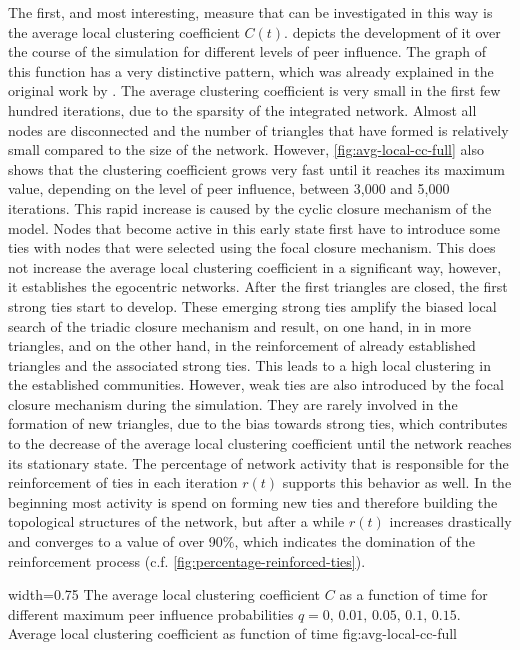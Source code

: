 The first, and most interesting, measure that can be investigated in this way is the average local clustering coefficient \( C(t) \).
 depicts the development of it over the course of the simulation for different levels of peer influence.
The graph of this function has a very distinctive pattern, which was already explained in the original work by \citet{Laurent2015}.
The average clustering coefficient is very small in the first few hundred iterations, due to the sparsity of the integrated network.
Almost all nodes are disconnected and the number of triangles that have formed is relatively small compared to the size of the network.
However, \cref{fig:avg-local-cc-full} also shows that the clustering coefficient grows very fast until it reaches its maximum value, depending on the level of peer influence, between 3,000 and 5,000 iterations.
This rapid increase is caused by the cyclic closure mechanism of the model.
Nodes that become active in this early state first have to introduce some ties with nodes that were selected using the focal closure mechanism.
This does not increase the average local clustering coefficient in a significant way, however, it establishes the egocentric networks.
After the first triangles are closed, the first strong ties start to develop.
These emerging strong ties amplify the biased local search of the triadic closure mechanism and result, on one hand, in in more triangles, and on the other hand, in the reinforcement of already established triangles and the associated strong ties.
This leads to a high local clustering in the established communities.
However, weak ties are also introduced by the focal closure mechanism during the simulation.
They are rarely involved in the formation of new triangles, due to the bias towards strong ties, which contributes to the decrease of the average local clustering coefficient until the network reaches its stationary state.
The percentage of network activity that is responsible for the reinforcement of ties in each iteration \( r(t) \) supports this behavior as well.
In the beginning most activity is spend on forming new ties and therefore building the topological structures of the network, but after a while \( r(t) \) increases drastically and converges to a value of over 90\%, which indicates the domination of the reinforcement process (c.f. \cref{fig:percentage-reinforced-ties}).


      {width=0.75\textwidth}
      {The average local clustering coefficient \( C \) as a function of time for different maximum peer influence probabilities \( q = 0, \, 0.01, \, 0.05, \, 0.1, \, 0.15\). }
      {Average local clustering coefficient as function of time}
      {fig:avg-local-cc-full}


